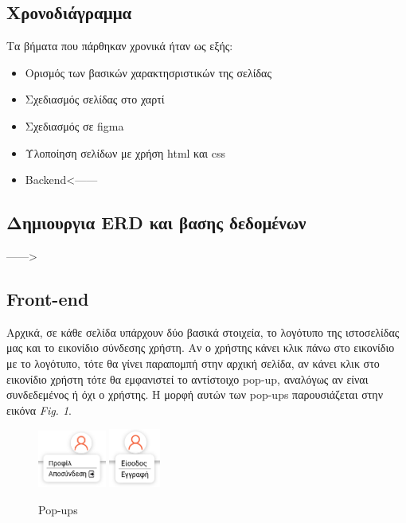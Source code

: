 \documentclass{acmart}
\begin{document}
\subsection*{Χρονοδιάγραμμα}
Τα βήματα που πάρθηκαν χρονικά ήταν ως εξής:
\begin{itemize}
    \item Ορισμός των βασικών χαρακτησριστικών της σελίδας
    \item Σχεδιασμός σελίδας στο χαρτί
    \item Σχεδιασμός σε figma
    \item Υλοποίηση σελίδων με χρήση html και css
    \item Backend<------
\end{itemize}

\subsection*{Δημιουργια ERD και βασης δεδομένων}

------>
 
\subsection{Front-end}
Αρχικά, σε κάθε σελίδα υπάρχουν δύο βασικά στοιχεία, το λογότυπο της ιστοσελίδας μας και το εικονίδιο σύνδεσης χρήστη. Αν ο χρήστης κάνει κλικ πάνω στο εικονίδιο με το λογότυπο, τότε θα γίνει παραπομπή στην αρχική σελίδα, αν κάνει κλικ στο εικονίδιο χρήστη τότε θα εμφανιστεί το αντίστοιχο pop-up, αναλόγως αν είναι συνδεδεμένος ή όχι ο χρήστης. Η μορφή αυτών των pop-ups παρουσιάζεται στην εικόνα \emph{Fig. 1}.
\begin{figure}[H]
       \includegraphics[width=0.2\textwidth]{pop-up_1.png}
       \includegraphics[width=0.15\textwidth]{pop-up_2.png}
       \caption{Pop-ups}
       \label{fig:pop-ups}
\end{figure}
\end{document}
